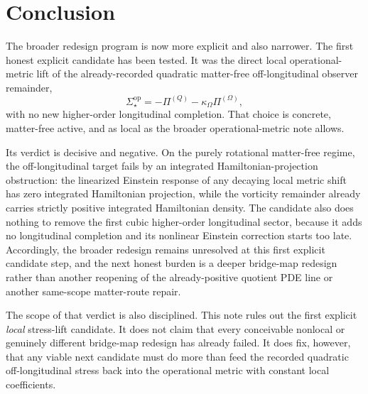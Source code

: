 \documentclass[11pt]{article}
\newcommand{\PiQ}{\Pi^{(Q)}}
\newcommand{\PiOmega}{\Pi^{(\Omega)}}
\newcommand{\SigmaOpStar}{\Sigma^{\mathrm{op}}_\star}
\begin{document}
\section{Conclusion}

The broader redesign program is now more explicit and also narrower. The first honest explicit candidate has been tested. It was the direct local operational-metric lift of the already-recorded quadratic matter-free off-longitudinal observer remainder,
\[
\SigmaOpStar
=
-\PiQ-\kappa_\Omega\PiOmega,
\]
with no new higher-order longitudinal completion. That choice is concrete, matter-free active, and as local as the broader operational-metric note allows.

Its verdict is decisive and negative. On the purely rotational matter-free regime, the off-longitudinal target fails by an integrated Hamiltonian-projection obstruction: the linearized Einstein response of any decaying local metric shift has zero integrated Hamiltonian projection, while the vorticity remainder already carries strictly positive integrated Hamiltonian density. The candidate also does nothing to remove the first cubic higher-order longitudinal sector, because it adds no longitudinal completion and its nonlinear Einstein correction starts too late. Accordingly, the broader redesign remains unresolved at this first explicit candidate step, and the next honest burden is a deeper bridge-map redesign rather than another reopening of the already-positive quotient PDE line or another same-scope matter-route repair.

The scope of that verdict is also disciplined. This note rules out the first explicit \emph{local} stress-lift candidate. It does not claim that every conceivable nonlocal or genuinely different bridge-map redesign has already failed. It does fix, however, that any viable next candidate must do more than feed the recorded quadratic off-longitudinal stress back into the operational metric with constant local coefficients.
\end{document}
